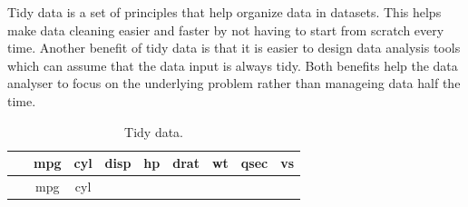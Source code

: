 \documentclass[12pt,oneside]{reedthesis}
\theoremstyle{definition}
\theoremstyle{definition}
\theoremstyle{definition}
\theoremstyle{remark}
\begin{document}
Tidy data is a set of principles that help organize data in datasets.
This helps make data cleaning easier and faster by not having to start
from scratch every time. Another benefit of tidy data is that it is
easier to design data analysis tools which can assume that the data
input is always tidy. Both benefits help the data analyser to focus on
the underlying problem rather than manageing data half the time.
\begin{longtable}[]{@{}ccccccccc@{}}
\caption{Tidy data.}\tabularnewline
\toprule
\begin{minipage}[b]{0.24\columnwidth}\centering\strut
~\strut
\end{minipage} & \begin{minipage}[b]{0.07\columnwidth}\centering\strut
mpg\strut
\end{minipage} & \begin{minipage}[b]{0.06\columnwidth}\centering\strut
cyl\strut
\end{minipage} & \begin{minipage}[b]{0.07\columnwidth}\centering\strut
disp\strut
\end{minipage} & \begin{minipage}[b]{0.06\columnwidth}\centering\strut
hp\strut
\end{minipage} & \begin{minipage}[b]{0.07\columnwidth}\centering\strut
drat\strut
\end{minipage} & \begin{minipage}[b]{0.08\columnwidth}\centering\strut
wt\strut
\end{minipage} & \begin{minipage}[b]{0.08\columnwidth}\centering\strut
qsec\strut
\end{minipage} & \begin{minipage}[b]{0.04\columnwidth}\centering\strut
vs\strut
\end{minipage}\tabularnewline
\midrule
\endfirsthead
\toprule
\begin{minipage}[b]{0.24\columnwidth}\centering\strut
~\strut
\end{minipage} & \begin{minipage}[b]{0.07\columnwidth}\centering\strut
mpg\strut
\end{minipage} & \begin{minipage}[b]{0.06\columnwidth}\centering\strut
cyl\strut
\end{minipage} & \begin{minipage}[b]{0.07\columnwidth}\centering\strut

\end{minipage}
\end{longtable}
\end{document}
